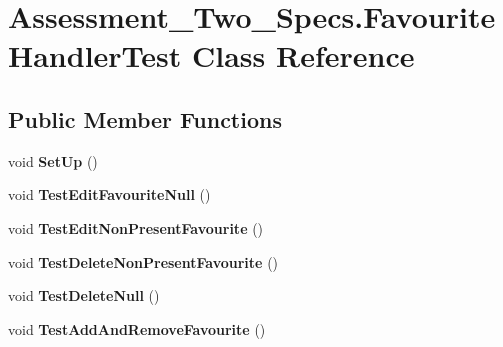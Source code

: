 \hypertarget{class_assessment___two___specs_1_1_favourite_handler_test}{
\section{Assessment\_\-Two\_\-Specs.FavouriteHandlerTest Class Reference}
\label{class_assessment___two___specs_1_1_favourite_handler_test}
}
\subsection*{Public Member Functions}
\begin{DoxyCompactItemize}
\item 
\hypertarget{class_assessment___two___specs_1_1_favourite_handler_test_adfef1d77b9673da055082ff4b08f93ba}{
void {\bfseries SetUp} ()}
\label{class_assessment___two___specs_1_1_favourite_handler_test_adfef1d77b9673da055082ff4b08f93ba}

\item 
\hypertarget{class_assessment___two___specs_1_1_favourite_handler_test_a199fd3e8106eec680bf8691b3ac795e7}{
void {\bfseries TestEditFavouriteNull} ()}
\label{class_assessment___two___specs_1_1_favourite_handler_test_a199fd3e8106eec680bf8691b3ac795e7}

\item 
\hypertarget{class_assessment___two___specs_1_1_favourite_handler_test_a4ef28b935e4b00cd6fd568febc9a24e4}{
void {\bfseries TestEditNonPresentFavourite} ()}
\label{class_assessment___two___specs_1_1_favourite_handler_test_a4ef28b935e4b00cd6fd568febc9a24e4}

\item 
\hypertarget{class_assessment___two___specs_1_1_favourite_handler_test_ad2fda69d34cff4109d83482037b7c595}{
void {\bfseries TestDeleteNonPresentFavourite} ()}
\label{class_assessment___two___specs_1_1_favourite_handler_test_ad2fda69d34cff4109d83482037b7c595}

\item 
\hypertarget{class_assessment___two___specs_1_1_favourite_handler_test_a58f51834bafb93c3c11d1e39b5f63fd7}{
void {\bfseries TestDeleteNull} ()}
\label{class_assessment___two___specs_1_1_favourite_handler_test_a58f51834bafb93c3c11d1e39b5f63fd7}

\item 
\hypertarget{class_assessment___two___specs_1_1_favourite_handler_test_af0c39eb7b26995eea2cef16b5effb029}{
void {\bfseries TestAddAndRemoveFavourite} ()}
\label{class_assessment___two___specs_1_1_favourite_handler_test_af0c39eb7b26995eea2cef16b5effb029}


\end{DoxyCompactItemize}

